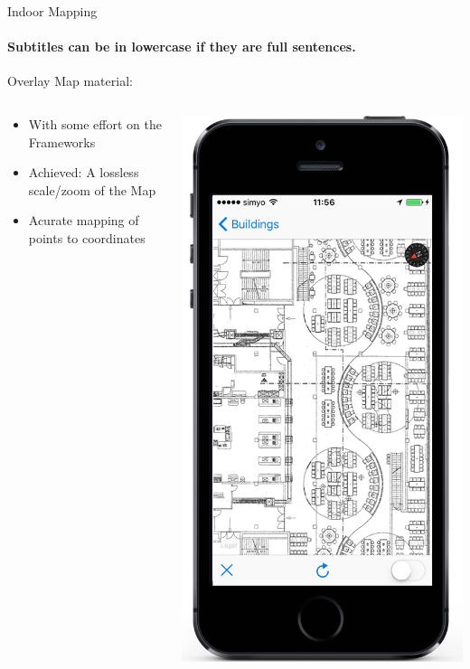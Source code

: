 \documentclass[11pt]{beamer}
\begin{document}
\begin{frame}{Indoor Mapping}

\framesubtitle{Subtitles can be in lowercase if they are full sentences.}
Overlay Map material:

  \begin{columns}[T]
  \begin{column}{.6\textwidth}
  \begin{itemize}
    \item With some effort on the Frameworks
    \item Achieved: A lossless scale/zoom of the Map
    \item Acurate mapping of points to coordinates
  \end{itemize}
  \end{column}
  \begin{column}{.4\textwidth}
  \includegraphics[scale=0.25]{mapisready}
  \end{column}
\end{columns}


\end{frame}
\end{document}
